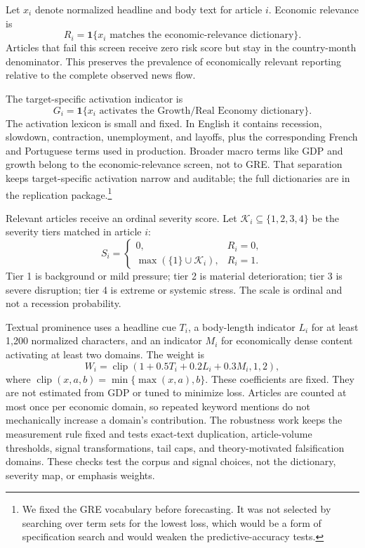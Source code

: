 \documentclass[preprint,12pt,authoryear]{elsarticle}
\begin{document}
Let $x_i$ denote normalized headline and body text for article $i$. Economic
relevance is
\begin{equation}
R_i = \mathbf{1}\{x_i \text{ matches the economic-relevance dictionary}\}.
\label{eq:relevance}
\end{equation}
Articles that fail this screen receive zero risk score but stay in the
country-month denominator. This preserves the prevalence of economically
relevant reporting relative to the complete observed news flow.

The target-specific activation indicator is
\begin{equation}
G_i = \mathbf{1}\{x_i \text{ activates the Growth/Real Economy dictionary}\}.
\label{eq:growthdomain}
\end{equation}
The activation lexicon is small and fixed. In English it contains recession,
slowdown, contraction, unemployment, and layoffs, plus the corresponding French
and Portuguese terms used in production. Broader macro terms like GDP and
growth belong to the economic-relevance screen, not to GRE. That separation
keeps target-specific activation narrow and auditable; the full dictionaries
are in the replication package.\footnote{We fixed the GRE vocabulary before
forecasting. It was not selected by searching over term sets for the lowest
loss, which would be a form of specification search and would weaken the
predictive-accuracy tests.}

Relevant articles receive an ordinal severity score. Let $\mathcal{K}_i
\subseteq \{1,2,3,4\}$ be the severity tiers matched in article $i$:
\begin{equation}
S_i = \begin{cases}
0, & R_i = 0, \\
\max(\{1\} \cup \mathcal{K}_i), & R_i = 1.
\end{cases}
\label{eq:severity}
\end{equation}
Tier 1 is background or mild pressure; tier 2 is material deterioration; tier 3 is
severe disruption; tier 4 is extreme or systemic stress. The scale is ordinal and
not a recession probability.

Textual prominence uses a headline cue $T_i$, a body-length indicator $L_i$
for at least 1,200 normalized characters, and an indicator $M_i$ for
economically dense content activating at least two domains. The weight is
\begin{equation}
W_i = \operatorname{clip}(1 + 0.5 T_i + 0.2 L_i + 0.3 M_i, 1, 2),
\label{eq:weight}
\end{equation}
where $\operatorname{clip}(x,a,b)=\min\{\max(x,a),b\}$. These coefficients are
fixed. They are not estimated from GDP or tuned to minimize loss. Articles are
counted at most once per economic domain, so repeated keyword mentions do not
mechanically increase a domain's contribution. The robustness work keeps the
measurement rule fixed and tests exact-text duplication, article-volume
thresholds, signal transformations, tail caps, and theory-motivated
falsification domains. These checks test the corpus and signal choices, not the
dictionary, severity map, or emphasis weights.
\end{document}
